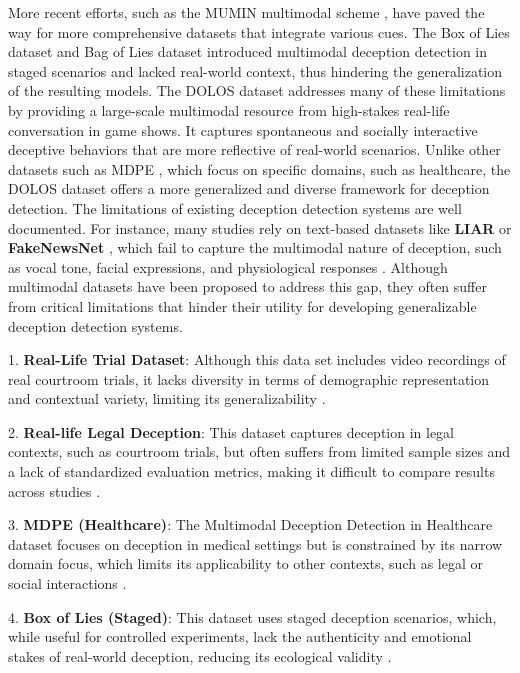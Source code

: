 \documentclass[11pt]{article}
\begin{document}
More recent efforts, such as the MUMIN multimodal scheme \citep{article}, have paved the way for more comprehensive datasets that integrate various cues. The Box of Lies dataset \citep{soldner2019box} and Bag of Lies dataset \citep{9025340} introduced multimodal deception detection in staged scenarios and lacked real-world context, thus hindering the generalization of the resulting models. The DOLOS dataset \citep{guo2023audiovisualdeceptiondetectiondolos} addresses many of these limitations by providing a large-scale multimodal resource from high-stakes real-life conversation in game shows. It captures spontaneous and socially interactive deceptive behaviors that are more reflective of real-world scenarios. Unlike other datasets such as MDPE \citep{cai2024mdpemultimodaldeceptiondataset}, which focus on specific domains, such as healthcare, the DOLOS dataset offers a more generalized and diverse framework for deception detection. The limitations of existing deception detection systems are well documented. For instance, many studies rely on text-based datasets like \textbf{LIAR} \citep{wang2017liarliarpantsfire} or \textbf{FakeNewsNet} \citep{shu2019fakenewsnet}, which fail to capture the multimodal nature of deception, such as vocal tone, facial expressions, and physiological responses \citep{10.1177/0261927X02021004001}. Although multimodal datasets have been proposed to address this gap, they often suffer from critical limitations that hinder their utility for developing generalizable deception detection systems.

1. \textbf{Real-Life Trial Dataset}: Although this data set includes video recordings of real courtroom trials, it lacks diversity in terms of demographic representation and contextual variety, limiting its generalizability \citep{fornaciari2014identifying}.

2. \textbf{Real-life Legal Deception}: This dataset captures deception in legal contexts, such as courtroom trials, but often suffers from limited sample sizes and a lack of standardized evaluation metrics, making it difficult to compare results across studies \citep{perez2015deception}.

3. \textbf{MDPE (Healthcare)}: The Multimodal Deception Detection in Healthcare dataset focuses on deception in medical settings but is constrained by its narrow domain focus, which limits its applicability to other contexts, such as legal or social interactions \citep{cai2024mdpemultimodaldeceptiondataset}.

4. \textbf{Box of Lies (Staged)}: This dataset uses staged deception scenarios, which, while useful for controlled experiments, lack the authenticity and emotional stakes of real-world deception, reducing its ecological validity \citep{Benus2016}.
\end{document}
